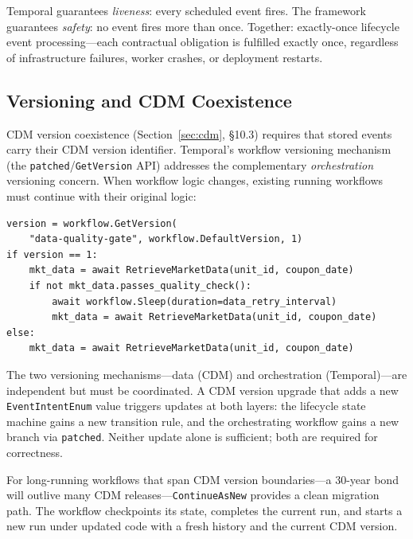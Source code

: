 \documentclass[11pt,a4paper]{article}
\begin{document}
\noindent Temporal guarantees \emph{liveness}: every scheduled event fires. The framework guarantees \emph{safety}: no event fires more than once. Together: exactly-once lifecycle event processing---each contractual obligation is fulfilled exactly once, regardless of infrastructure failures, worker crashes, or deployment restarts.

\subsection{Versioning and CDM Coexistence}
\label{sec:temporal-versioning}

CDM version coexistence (Section~\ref{sec:cdm}, \S10.3) requires that stored events carry their CDM version identifier. Temporal's workflow versioning mechanism (the \texttt{patched}/\texttt{GetVersion} API) addresses the complementary \emph{orchestration} versioning concern. When workflow logic changes, existing running workflows must continue with their original logic:

\begin{lstlisting}
version = workflow.GetVersion(
    "data-quality-gate", workflow.DefaultVersion, 1)
if version == 1:
    mkt_data = await RetrieveMarketData(unit_id, coupon_date)
    if not mkt_data.passes_quality_check():
        await workflow.Sleep(duration=data_retry_interval)
        mkt_data = await RetrieveMarketData(unit_id, coupon_date)
else:
    mkt_data = await RetrieveMarketData(unit_id, coupon_date)
\end{lstlisting}

\noindent The two versioning mechanisms---data (CDM) and orchestration (Temporal)---are independent but must be coordinated. A CDM version upgrade that adds a new \texttt{EventIntentEnum} value triggers updates at both layers: the lifecycle state machine gains a new transition rule, and the orchestrating workflow gains a new branch via \texttt{patched}. Neither update alone is sufficient; both are required for correctness.

For long-running workflows that span CDM version boundaries---a 30-year bond will outlive many CDM releases---\texttt{ContinueAsNew} provides a clean migration path. The workflow checkpoints its state, completes the current run, and starts a new run under updated code with a fresh history and the current CDM version.

\end{document}
